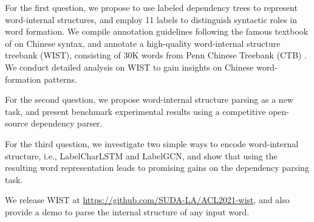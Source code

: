 For the first question, we propose to use labeled dependency trees to represent word-internal structures, and employ 11 labels to distinguish syntactic roles in word formation. We compile annotation guidelines following the famous textbook of \citet{grammar-notes-zhu-1982} on Chinese syntax, and annotate a high-quality word-internal structure treebank (WIST), consisting of 30K words from Penn Chinese Treebank (CTB) \cite{ctb-xiafei}. We conduct detailed analysis on WIST to gain insights on Chinese word-formation patterns.

For the second question, we propose word-internal structure parsing as a new task, and present benchmark experimental results using a competitive open-source dependency parser. 

For the third question, we investigate two simple ways to encode word-internal structure, i.e., LabelCharLSTM and LabelGCN, and show that using the resulting word representation leads to promising gains on the dependency parsing task.

We release WIST at \url{https://github.com/SUDA-LA/ACL2021-wist}, and also provide a demo to parse the internal structure of any input word. 



 


